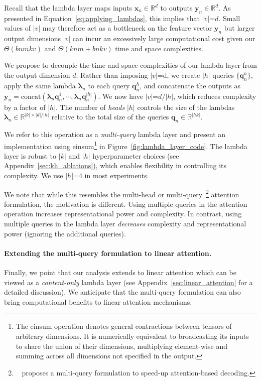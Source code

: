 \documentclass{article} \usepackage{iclr2021_conference,times}
\begin{document}
Recall that the lambda layer maps inputs $\boldsymbol{x}_n \in \mathbb{R}^d$ to outputs $\boldsymbol{y}_n \in \mathbb{R}^d$.
As presented in Equation~\ref{eq:applying_lambdas}, this implies that $|v|$=$d$.
Small values of $|v|$ may therefore act as a bottleneck on the feature vector $\boldsymbol{y}_n$ but larger output dimensions $|v|$ can incur an excessively large computational cost given our $\Theta(bnmkv)$ and $\Theta(knm + bnkv)$ time and space complexities.

We propose to decouple the time and space complexities of our lambda layer from the output dimension $d$.
Rather than imposing $|v|$=d, we create $|h|$ queries $\{\boldsymbol{q}^h_n\}$, apply the same lambda $\boldsymbol{\lambda}_n$ to each query $\boldsymbol{q}^h_n$, and concatenate the outputs as $\boldsymbol{y}_n = \textrm{concat}(\boldsymbol{\lambda}_n \boldsymbol{q}^1_n, \cdots, \boldsymbol{\lambda}_n \boldsymbol{q}^{|h|}_n)$.
We now have $|v|$=$d/|h|$, which reduces complexity by a factor of $|h|$.
The number of \emph{heads} $|h|$ controls the size of the lambdas $\boldsymbol{\lambda}_n \in \mathbb{R}^{|k|\times|d|/|h|}$ relative to the total size of the queries $\boldsymbol{q}_n \in \mathbb{R}^{|hk|}$.

We refer to this operation as a \emph{multi-query} lambda layer and present an implementation using einsum\footnote{
The einsum operation denotes general contractions between tensors of arbitrary dimensions.
It is numerically equivalent to broadcasting its inputs to share the union of their dimensions, multiplying element-wise and summing across all dimensions not specified in the output.
} in Figure~\ref{fig:lambda_layer_code}.
The lambda layer is robust to $|k|$ and $|h|$ hyperparameter choices (see Appendix~\ref{sec:kh_ablations}), which enables flexibility in controlling its complexity.
We use $|h|$=4 in most experiments.

We note that while this resembles the multi-head or multi-query~\citep{shazeer2019fast}\footnote{~\citep{shazeer2019fast} proposes a multi-query formulation to speed-up attention-based decoding.}
attention formulation, the motivation is different.
Using multiple queries in the attention operation increases representational power and complexity.
In contrast, using multiple queries in the lambda layer \emph{decreases} complexity and representational power (ignoring the additional queries).

\vspace{-0.1cm}
\paragraph{Extending the multi-query formulation to linear attention.}
Finally, we point that our analysis extends to linear attention which can be viewed as a \emph{content-only} lambda layer (see Appendix~\ref{sec:linear_attention} for a detailed discussion).
We anticipate that the multi-query formulation can also bring computational benefits to linear attention mechanisms.
\end{document}
